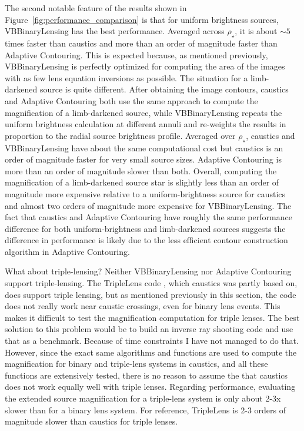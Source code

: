 \documentclass[12pt,dvipsnames]{report}
\newcommand{\ssf}[1]{\textsf{#1}}
\begin{document}
The second notable feature of the results shown in Figure~\ref{fig:performance_comparison}
is that for uniform brightness sources, \ssf{VBBinaryLensing} has the best performance.
Averaged across $\rho_\star$, it is about $\sim 5$ times faster than \ssf{caustics} and 
more than an order of magnitude faster than \ssf{Adaptive Contouring}. This is expected
because, as mentioned previously, \ssf{VBBinaryLensing} is perfectly optimized for 
computing the area of the images with as few lens equation inversions as possible. 
The situation for a limb-darkened source is quite different. After obtaining the 
image contours, \ssf{caustics} and \ssf{Adaptive Contouring} both use the same approach 
to compute the magnification of a limb-darkened source, while \ssf{VBBinaryLensing} repeats
the uniform brightness calculation at different annuli and re-weights the results in proportion to 
the radial source brightness profile. Averaged over $\rho_\star$, \ssf{caustics} and 
\ssf{VBBinaryLensing} have about the same computational cost but \ssf{caustics} is an order 
of magnitude faster for very small source sizes. \ssf{Adaptive Contouring} is more than an 
order of magnitude slower than both. Overall, computing the magnification of a limb-darkened 
source star is slightly less than an order of magnitude more expensive relative to 
a uniform-brightness source for \ssf{caustics} and almost two orders of magnitude more 
expensive for \ssf{VBBinaryLensing}. 
The fact that \ssf{caustics} and \ssf{Adaptive Contouring} have roughly the same performance 
difference for both uniform-brightness and limb-darkened sources suggests the difference 
in performance is likely due to the less efficient contour construction algorithm  in 
\ssf{Adaptive Contouring}.

What about triple-lensing? Neither \ssf{VBBinaryLensing} nor \ssf{Adaptive Contouring} 
support triple-lensing. The \ssf{TripleLens} code \citep{2021MNRAS.503.6143K}, which 
\ssf{caustics} was partly based on, does support triple 
lensing, but as mentioned previously in this section, the code does not really work
near caustic crossings, even for binary lens events. 
This makes it difficult to test the magnification computation for triple lenses. The 
best solution to this problem would be to build an inverse ray shooting code and use that
as a benchmark. Because of time constraints I have not managed to do that. 
However, since the exact same algorithms and functions are 
used to compute the magnification for binary and triple-lens systems in \ssf{caustics},
and all these functions are extensively tested, there is no reason to assume the that 
\ssf{caustics} does not work equally well with triple lenses. 
Regarding performance, evaluating the extended source magnification for a triple-lens system 
is only about 2-3x slower than for a binary lens system. 
For reference, \ssf{TripleLens} is 2-3 orders of magnitude slower than \ssf{caustics} for 
triple lenses.
\end{document}
